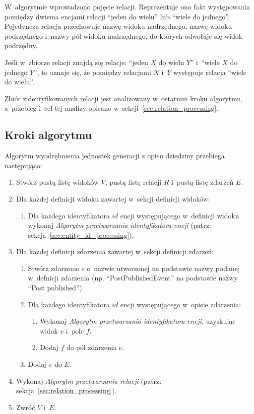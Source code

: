 W~algorytmie wprowadzono pojęcie relacji.
Reprezentuje ono fakt występowania pomiędzy dwiema encjami relacji ``jeden do wielu'' lub ``wiele do jednego''.
Pojedyncza relacja przechowuje nazwę widoku nadrzędnego, nazwę widoku podrzędnego i~nazwy pól widoku nadrzędnego, do których odwołuje się widok podrzędny.

Jeśli w~zbiorze relacji znajdą się relacje: ``jeden $X$ do wielu $Y$'' i~``wiele $X$ do jednego $Y$'', to uznaje się, że pomiędzy relacjami $X$ i~$Y$ występuje relacja ``wiele do wielu''.

Zbiór zidentyfikowanych relacji jest analizowany w~ostatnim kroku algorytmu, a~przebieg i~cel tej analizy opisano w~sekcji~\ref{sec:relation_processing}.


\subsection{Kroki algorytmu}

Algorytm wyodrębnienia jednostek generacji z opisu dziedziny przebiega następująco:

\begin{enumerate}
 \item Stwórz pustą listę widoków $V$, pustą listę relacji $R$ i~pustą listę zdarzeń $E$.
 \item Dla każdej definicji widoku zawartej w~sekcji definicji widoków:
  \begin{enumerate}
   \item Dla każdego identyfikatora $id$ encji występującego w~definicji widoku wykonaj \emph{Algorytm przetwarzania identyfikatora encji} (patrz: sekcja~\ref{sec:entity_id_processing}).
  \end{enumerate}
 
 \item Dla każdej definicji zdarzenia zawartej w~sekcji definicji zdarzeń:
  \begin{enumerate}
   \item Stwórz zdarzenie $e$ o~nazwie utworzonej na podstawie nazwy podanej w~defnicji zdarzenia (np. ``PostPublishedEvent'' na podstawie nazwy ``Post published'').
   \item Dla każdego identyfikatora $id$ encji występującego w~opisie zdarzenia:
    \begin{enumerate}
     \item Wykonaj \emph{Algorytm przetwarzania identyfikatora encji}, uzyskując widok $v$ i~pole $f$.
     \item Dodaj $f$ do pól zdarzenia $e$.
    \end{enumerate}
   \item Dodaj $e$ do $E$.
  \end{enumerate}
  
 \item Wykonaj \emph{Algorytm przetwarzania relacji} (patrz: sekcja~\ref{sec:relation_processing}).

 \item Zwróć $V$ i~$E$.
\end{enumerate}


